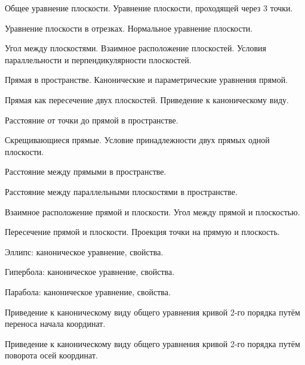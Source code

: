 \begin{question}
Общее уравнение плоскости. Уравнение плоскости, проходящей через 3
точки.
\end{question}
\begin{question}
Уравнение плоскости в отрезках. Нормальное уравнение плоскости.
\end{question}
\begin{question}
Угол между плоскостями. Взаимное расположение плоскостей. Условия
параллельности и перпендикулярности плоскостей.
\end{question}
\begin{question}
Прямая в пространстве. Канонические и параметрические уравнения
прямой.
\end{question}
\begin{question}
Прямая как пересечение двух плоскостей. Приведение к каноническому
виду.
\end{question}
\begin{question}
Расстояние от точки до прямой в пространстве.
\end{question}
\begin{question}
Скрещивающиеся прямые. Условие принадлежности двух прямых одной
плоскости.
\end{question}
\begin{question}
Расстояние между прямыми в пространстве.
\end{question}
\begin{question}
Расстояние между параллельными плоскостями в пространстве.
\end{question}
\begin{question}
Взаимное расположение прямой и плоскости. Угол между прямой и
плоскостью.
\end{question}
\begin{question}
Пересечение прямой и плоскости. Проекция точки на прямую и плоскость.
\end{question}
\begin{question}
Эллипс: каноническое уравнение, свойства.
\end{question}
\begin{question}
Гипербола: каноническое уравнение, свойства.
\end{question}
\begin{question}
Парабола: каноническое уравнение, свойства.
\end{question}
\begin{question}
Приведение к каноническому виду общего уравнения кривой 2-го
порядка путём переноса начала координат.
\end{question}
\begin{question}
Приведение к каноническому виду общего уравнения кривой 2-го
порядка путём поворота осей координат.
\end{question}

